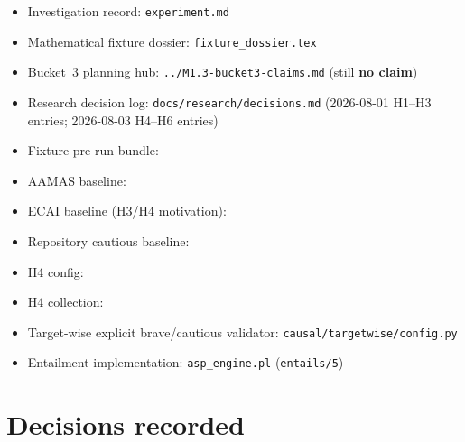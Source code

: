 \documentclass[11pt]{article}
\begin{document}
\begin{itemize}
  \item Investigation record: \texttt{experiment.md}
  \item Mathematical fixture dossier: \texttt{fixture\_dossier.tex}
  \item Bucket~3 planning hub: \texttt{../M1.3-bucket3-claims.md}
    (still \textbf{no claim})
  \item Research decision log: \texttt{docs/research/decisions.md}
    (2026-08-01 H1--H3 entries; 2026-08-03 H4--H6 entries)
  \item Fixture pre-run bundle:
  \item AAMAS baseline:
  \item ECAI baseline (H3/H4 motivation):
  \item Repository cautious baseline:
  \item H4 config:
  \item H4 collection:
  \item Target-wise explicit brave/cautious validator:
    \texttt{causal/targetwise/config.py}
  \item Entailment implementation: \texttt{asp\_engine.pl} (\texttt{entails/5})
\end{itemize}

\section{Decisions recorded}
\end{document}
